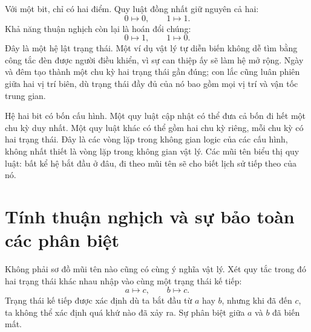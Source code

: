 Với một bit, chỉ có hai điểm. Quy luật đồng nhất giữ nguyên cả hai:
\begin{equation}
  0\mapsto0,
  \qquad
  1\mapsto1.
  \label{eq:l01-identity-update}
\end{equation}
Khả năng thuận nghịch còn lại là hoán đổi chúng:
\begin{equation}
  0\mapsto1,
  \qquad
  1\mapsto0.
  \label{eq:l01-flip-update}
\end{equation}
Đây là một hệ lật trạng thái. Một ví dụ vật lý tự diễn biến không dễ tìm bằng công tắc đèn được người điều khiển, vì sự can thiệp ấy sẽ làm hệ mở rộng. Ngày và đêm tạo thành một chu kỳ hai trạng thái gần đúng; con lắc cũng luân phiên giữa hai vị trí biên, dù trạng thái đầy đủ của nó bao gồm mọi vị trí và vận tốc trung gian.

\begin{classroomqa}
\end{classroomqa}

Hệ hai bit có bốn cấu hình. Một quy luật cập nhật có thể đưa cả bốn đi hết một chu kỳ duy nhất. Một quy luật khác có thể gồm hai chu kỳ riêng, mỗi chu kỳ có hai trạng thái. Đây là các vòng lặp trong không gian logic của các cấu hình, không nhất thiết là vòng lặp trong không gian vật lý. Các mũi tên biểu thị quy luật: bất kể hệ bắt đầu ở đâu, đi theo mũi tên sẽ cho biết lịch sử tiếp theo của nó.

\section{Tính thuận nghịch và sự bảo toàn các phân biệt}

Không phải sơ đồ mũi tên nào cũng có cùng ý nghĩa vật lý. Xét quy tắc trong đó hai trạng thái khác nhau nhập vào cùng một trạng thái kế tiếp:
\begin{equation}
  a\mapsto c,
  \qquad
  b\mapsto c.
  \label{eq:l01-merging-update}
\end{equation}
Trạng thái kế tiếp được xác định dù ta bắt đầu từ \(a\) hay \(b\), nhưng khi đã đến \(c\), ta không thể xác định quá khứ nào đã xảy ra. Sự phân biệt giữa \(a\) và \(b\) đã biến mất.

